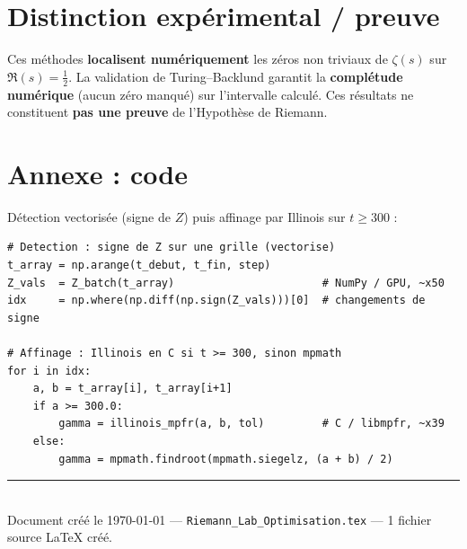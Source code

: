 \documentclass[11pt,a4paper]{article}
\begin{document}
\section{Distinction expérimental / preuve}

Ces méthodes \textbf{localisent numériquement} les zéros non triviaux de $\zeta(s)$ sur
$\Re(s)=\tfrac{1}{2}$. La validation de Turing--Backlund garantit la \textbf{complétude
numérique} (aucun zéro manqué) sur l'intervalle calculé. Ces résultats ne constituent
\textbf{pas une preuve} de l'Hypothèse de Riemann.

\section{Annexe : code}

Détection vectorisée (signe de $Z$) puis affinage par Illinois sur $t \geq 300$ :

\begin{lstlisting}
# Detection : signe de Z sur une grille (vectorise)
t_array = np.arange(t_debut, t_fin, step)
Z_vals  = Z_batch(t_array)                       # NumPy / GPU, ~x50
idx     = np.where(np.diff(np.sign(Z_vals)))[0]  # changements de signe

# Affinage : Illinois en C si t >= 300, sinon mpmath
for i in idx:
    a, b = t_array[i], t_array[i+1]
    if a >= 300.0:
        gamma = illinois_mpfr(a, b, tol)         # C / libmpfr, ~x39
    else:
        gamma = mpmath.findroot(mpmath.siegelz, (a + b) / 2)
\end{lstlisting}

\vfill
\noindent\rule{\textwidth}{0.4pt}\\
{\small Document créé le \today{} --- \texttt{Riemann\_Lab\_Optimisation.tex} ---
1 fichier source \LaTeX{} créé.}
\end{document}
